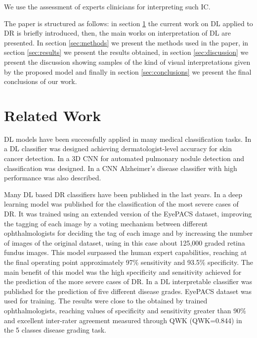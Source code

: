 \documentclass[review]{elsarticle}
\theoremstyle{definition} %
\theoremstyle{remark}
\begin{document}
  We use the assessment of experts clinicians for interpreting such IC.

The paper is structured as follows: in section \ref{sec:related} the current work on DL applied to DR is briefly introduced, then, the main works on interpretation of DL are presented. In section \ref{sec:methods} we present the methods used in the paper, in section \ref{sec:results} we present the results obtained, in section \ref{sec:discussion} we present the discussion showing samples of the kind of visual interpretations given by the proposed model and finally in section \ref{sec:conclusions} we present the final conclusions of our work.

\section{Related Work}\label{sec:related}

DL models have been successfully applied in many medical classification tasks. In \cite{esteva2017dermatologist} a DL classifier was designed achieving dermatologist-level accuracy for skin cancer detection. In \cite{wentao2018deeplung} a 3D CNN for automated pulmonary nodule detection and classification was designed. In \cite{wang2018classification} a CNN Alzheimer's disease classifier with high performance was also described. 

Many DL based DR classifiers have been published in the last years. In \cite{doi:10.1001/jama.2016.17216} a deep learning model was published for the classification of the most severe cases of DR. It was trained using an extended version of the EyePACS dataset, improving the tagging of each image by a voting mechanism between different ophthalmologists for deciding the tag of each image and by increasing the number of images of the original dataset, using in this case about 125,000 graded retina fundus images. This model surpassed the human expert capabilities, reaching at the final operating point approximately  97\% sensitivity and 93.5\% specificity. The main benefit of this model was the high specificity and sensitivity achieved for the prediction of the more severe cases of DR. In \cite{de2017deep} a DL interpretable classifier was published for the prediction of five different disease grades. EyePACS dataset was used for training. The results were close to the obtained by trained ophthalmologists, reaching values of specificity and sensitivity greater than 90\% and excellent inter-rater agreement measured through QWK (QWK=0.844) in the 5 classes disease grading task.
\end{document}
